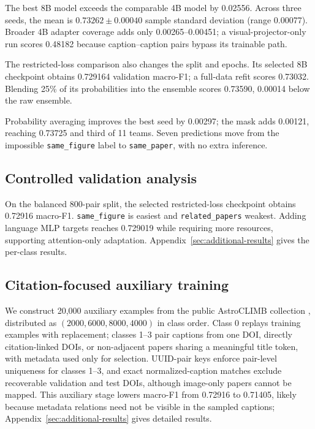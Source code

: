 \documentclass[11pt]{article}
\newcommand{\sfclass}{\texttt{same\_figure}}
\newcommand{\spclass}{\texttt{same\_paper}}
\newcommand{\rpclass}{\texttt{related\_papers}}
\begin{document}
The best 8B model exceeds the comparable 4B model by 0.02556.  Across three seeds, the mean is $0.73262\pm0.00040$ sample standard deviation (range 0.00077).  Broader 4B adapter coverage adds only 0.00265--0.00451; a visual-projector-only run scores 0.48182 because caption--caption pairs bypass its trainable path.

The restricted-loss comparison also changes the split and epochs.  Its selected 8B checkpoint obtains 0.729164 validation macro-F1; a full-data refit scores 0.73032.  Blending 25\% of its probabilities into the ensemble scores 0.73590, 0.00014 below the raw ensemble.

Probability averaging improves the best seed by 0.00297; the mask adds 0.00121, reaching 0.73725 and third of 11 teams.  Seven predictions move from the impossible \sfclass{} label to \spclass{}, with no extra inference.

\subsection{Controlled validation analysis}

On the balanced 800-pair split, the selected restricted-loss checkpoint obtains 0.72916 macro-F1.  \sfclass{} is easiest and \rpclass{} weakest.  Adding language MLP targets reaches 0.729019 while requiring more resources, supporting attention-only adaptation.  Appendix~\ref{sec:additional-results} gives the per-class results.

\subsection{Citation-focused auxiliary training}
\label{sec:auxiliary}

We construct 20,000 auxiliary examples from the public AstroCLIMB collection \citep{astroclimbdataset2026}, distributed as $(2000,6000,8000,4000)$ in class order.  Class 0 replays training examples with replacement; classes 1--3 pair captions from one DOI, directly citation-linked DOIs, or non-adjacent papers sharing a meaningful title token, with metadata used only for selection.  UUID-pair keys enforce pair-level uniqueness for classes 1--3, and exact normalized-caption matches exclude recoverable validation and test DOIs, although image-only papers cannot be mapped.  This auxiliary stage lowers macro-F1 from 0.72916 to 0.71405, likely because metadata relations need not be visible in the sampled captions; Appendix~\ref{sec:additional-results} gives detailed results.
\end{document}
